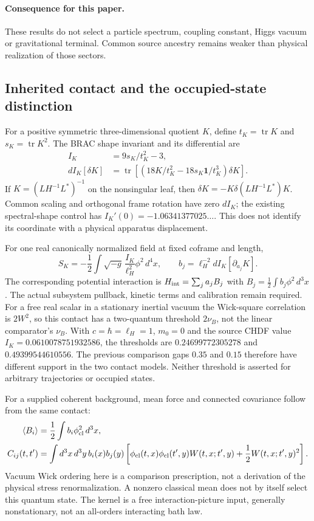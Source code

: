 \paragraph{Consequence for this paper.}
These results do not select a particle spectrum, coupling constant, Higgs vacuum or gravitational terminal. Common source ancestry remains weaker than physical realization of those sectors.

\subsection{Inherited contact and the occupied-state distinction}
For a positive symmetric three-dimensional quotient $K$, define
$t_K=\operatorname{tr}K$ and $s_K=\operatorname{tr}K^2$. The BRAC shape
invariant and its differential are
\begin{align}
 I_K&=9s_K/t_K^2-3,\\
 dI_K[\delta K]&=\operatorname{tr}
 \left[\left(18K/t_K^2-18s_K\mathbf{1}/t_K^3\right)\delta K\right].
\end{align}
If $K=(LH^{-1}L^*)^{-1}$ on the nonsingular leaf, then
$\delta K=-K\delta(LH^{-1}L^*)K$. Common scaling and orthogonal frame
rotation have zero $dI_K$; the existing spectral-shape control has
$I_K'(0)=-1.06341377025\ldots$. This does not identify its coordinate with
a physical apparatus displacement.

For one real canonically normalized field at fixed coframe and length,
\begin{equation}
 S_K=-\frac12\int \sqrt{-g}\,\frac{I_K}{\ell_H^2}\phi^2\,d^4x,
 \qquad b_j=\ell_H^{-2}dI_K[\partial_{a_j}K].
\end{equation}
The corresponding potential interaction is
$H_{\rm int}=\sum_j a_j B_j$ with
$B_j=\frac12\int b_j\phi^2\,d^3x$. The actual subsystem pullback,
kinetic terms and calibration remain required. For a free real scalar in
a stationary inertial vacuum the Wick-square correlation is $2W^2$,
so this contact has a two-quantum threshold $2\nu_B$, not the linear
comparator's $\nu_B$. With $c=\hbar=\ell_H=1$, $m_0=0$ and the
source CHDF value $I_K=0.0610078751932586$, the thresholds are
$0.24699772305278$ and $0.49399544610556$. The previous comparison gaps
$0.35$ and $0.15$ therefore have different support in the two contact models.
Neither threshold is asserted for arbitrary trajectories or occupied states.

For a supplied coherent background, mean force and connected covariance
follow from the same contact:
\begin{align}
 \langle B_i\rangle&=\frac12\int b_i\phi_{\rm cl}^2\,d^3x,\\
 C_{ij}(t,t')&=\int d^3x\,d^3y\,b_i(x)b_j(y)
 \left[\phi_{\rm cl}(t,x)\phi_{\rm cl}(t',y)W(t,x;t',y)
 +\frac12 W(t,x;t',y)^2\right].
\end{align}
Vacuum Wick ordering here is a comparison prescription, not a derivation
of the physical stress renormalization. A nonzero classical mean does not
by itself select this quantum state. The kernel is a free interaction-picture
input, generally nonstationary, not an all-orders interacting bath law.

